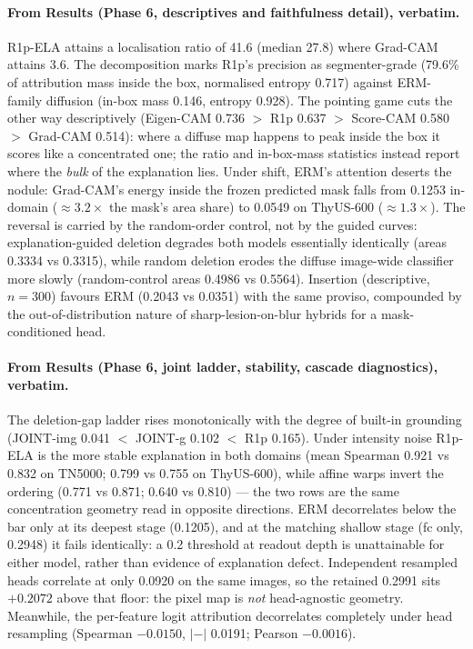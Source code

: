 \documentclass[11pt]{article}
\begin{document}
\paragraph{From Results (Phase 6, descriptives and faithfulness detail), verbatim.}
R1p-ELA attains a localisation ratio of 41.6 (median 27.8) where
Grad-CAM attains 3.6. The decomposition marks R1p's precision as
segmenter-grade (79.6\% of attribution mass inside the box, normalised
entropy 0.717) against ERM-family diffusion (in-box mass 0.146, entropy
0.928). The pointing game cuts the other way descriptively (Eigen-CAM
0.736 $>$ R1p 0.637 $>$ Score-CAM 0.580 $>$ Grad-CAM 0.514): where a
diffuse map happens to peak inside the box it scores like a concentrated
one; the ratio and in-box-mass statistics instead report where the
\emph{bulk} of the explanation lies. Under shift, ERM's attention
deserts the nodule: Grad-CAM's energy inside the frozen predicted mask
falls from 0.1253 in-domain (${\approx}3.2\times$ the mask's area share)
to 0.0549 on ThyUS-600 (${\approx}1.3\times$). The reversal is carried
by the random-order control, not by the guided curves:
explanation-guided deletion degrades both models essentially identically
(areas 0.3334 vs 0.3315), while random deletion erodes the diffuse
image-wide classifier more slowly (random-control areas 0.4986 vs
0.5564). Insertion (descriptive, $n{=}300$) favours ERM (0.2043 vs
0.0351) with the same proviso, compounded by the out-of-distribution
nature of sharp-lesion-on-blur hybrids for a mask-conditioned head.

\paragraph{From Results (Phase 6, joint ladder, stability, cascade diagnostics), verbatim.}
The deletion-gap ladder rises monotonically with the degree of built-in
grounding (JOINT-img 0.041 $<$ JOINT-g 0.102 $<$ R1p 0.165). Under
intensity noise R1p-ELA is the more stable explanation in both domains
(mean Spearman 0.921 vs 0.832 on TN5000; 0.799 vs 0.755 on ThyUS-600),
while affine warps invert the ordering (0.771 vs 0.871; 0.640 vs
0.810) --- the two rows are the same concentration geometry read in
opposite directions. ERM decorrelates below the bar only at its deepest
stage (0.1205), and at the matching shallow stage (fc only, 0.2948) it
fails identically: a 0.2 threshold at readout depth is unattainable for
either model, rather than evidence of explanation defect. Independent
resampled heads correlate at only 0.0920 on the same images, so the
retained 0.2991 sits $+0.2072$ above that floor: the pixel map is
\emph{not} head-agnostic geometry. Meanwhile, the per-feature logit
attribution decorrelates completely under head resampling (Spearman
$-0.0150$, $|{-}|$ 0.0191; Pearson $-0.0016$).
\end{document}
